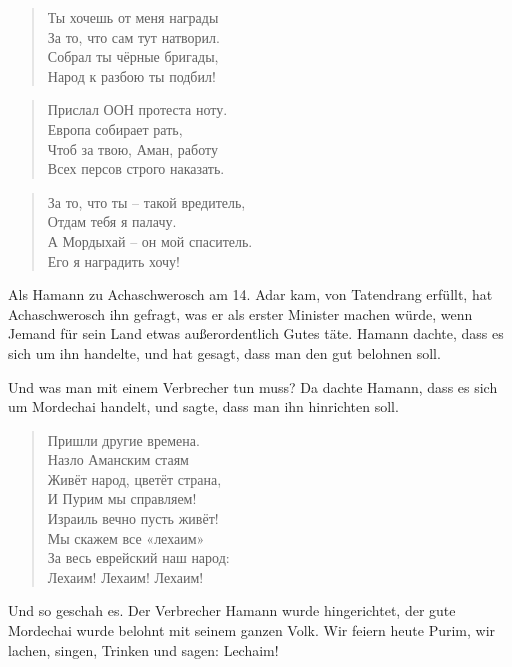 \documentclass[12pt,a4paper,titlepage]{article}
\begin{document}
\begin{drama}
\ahspeaks {}
\begin{verse}
Ты хочешь от меня награды\\
За то, что сам тут натворил.\\
Собрал ты чёрные бригады,\\
Народ к разбою ты подбил!\\
\end{verse}

\begin{verse}
Прислал ООН протеста ноту.\\
Европа собирает рать,\\
Чтоб за твою, Аман, работу\\
Всех персов строго наказать.\\
\end{verse}

\begin{verse}
За то, что ты -- такой вредитель,\\
Отдам тебя я палачу.\\
А Мордыхай -- он мой спаситель.\\
Его я наградить хочу!\\
\end{verse}


\uespeaks
Als Hamann zu Achaschwerosch am 14. Adar kam, von Tatendrang  erfüllt,
hat Achaschwerosch ihn gefragt, was er als erster Minister machen würde,
wenn Jemand für sein Land etwas außerordentlich Gutes täte. Hamann dachte,
dass es sich um ihn handelte, und hat gesagt, dass man den gut belohnen soll.
\par Und was man mit einem Verbrecher tun muss? Da dachte Hamann, dass es sich
um Mordechai handelt, und sagte, dass man ihn hinrichten soll.


\scene


\mspeaks
\begin{verse}
Пришли другие времена.\\
Назло Аманским стаям\\
Живёт народ, цветёт страна,\\
И Пурим мы справляем!\\
Израиль  вечно пусть живёт!\\
Мы скажем все «лехаим»\\
За весь еврейский наш народ:\\
Лехаим! Лехаим! Лехаим!\\
\end{verse}


\uespeaks
Und so geschah es. Der Verbrecher Hamann wurde hingerichtet,
der gute Mordechai wurde belohnt mit seinem ganzen Volk. 
Wir feiern heute Purim, wir lachen, singen, Trinken und sagen: Lechaim!


\end{drama}
\end{document}
